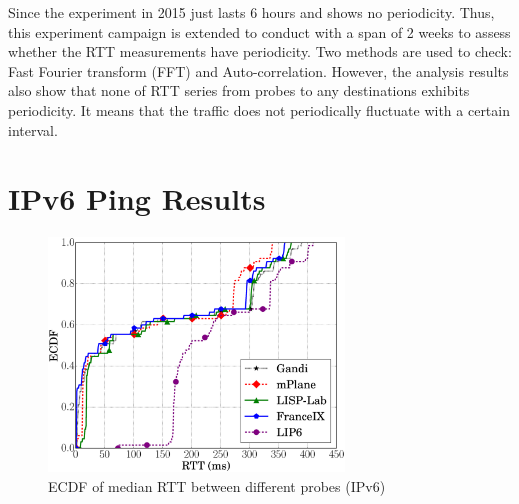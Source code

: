 Since the experiment in 2015 just lasts 6 hours and shows no periodicity. Thus, this experiment campaign is extended to conduct with a span of 2 weeks to assess whether the RTT measurements have periodicity. Two methods are used to check: Fast Fourier transform (FFT) and Auto-correlation. However, the analysis results also show that none of RTT series from probes to any destinations exhibits periodicity. It means that the traffic does not periodically fluctuate with a certain interval.


\section{IPv6 Ping Results}
\label{sec:pxtr_ping_v6}
\begin{figure}[!t]
	\centering
	\includegraphics[width=0.7\textwidth]{Pics/v6/CDF_avg(RTT)_median_4_20.eps}
	\caption{ECDF of median RTT between different probes (IPv6)}
	\label{ECDF_of_median_RTT_between_different_probes_v6_2016}
\end{figure}

